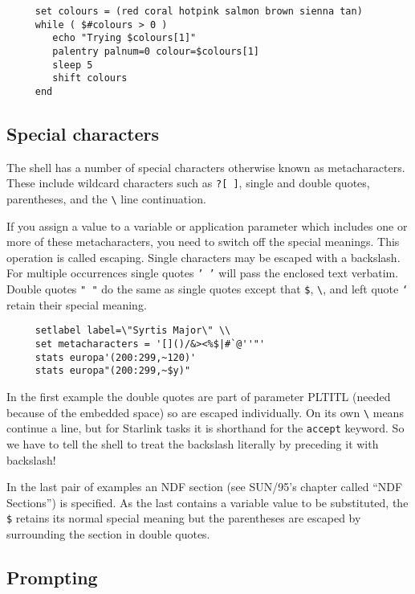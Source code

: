 \documentclass[twoside,11pt]{article}
\newcommand{\htmlref}[2]{#1}
\newcommand{\latex}[1]{#1}
\newcommand{\xref}[3]{#1}
\newcommand{\xlabel}[1]{}
\begin{document}
\small
\begin{verbatim}
     set colours = (red coral hotpink salmon brown sienna tan)
     while ( $#colours > 0 )
        echo "Trying $colours[1]"
        palentry palnum=0 colour=$colours[1]
        sleep 5
        shift colours
     end
\end{verbatim}
\normalsize


\subsection{\xlabel{sc4_se_spec_char}Special characters
\label{sc4_se_spec_char}}

The shell has a number of special characters otherwise known as
\htmlref{{\sf metacharacters}}{sc4_gl_met}.  These include
\htmlref{{\sf wildcard}}{sc4_gl_wild} characters such as {\tt *?[~]},
single and double quotes, parentheses, and the \verb+\+ line
continuation.

If you assign a value to a variable or application parameter which
includes one or more of these metacharacters, you need to switch off
the special meanings.  This operation is called escaping.
Single characters may be escaped with a backslash.  For multiple
occurrences single quotes {\tt '~'} will pass the enclosed text
verbatim.  Double quotes {\tt "~"} do the same as single quotes except
that {\tt \$}, \verb+\+, and left quote {\tt `} retain their special
meaning.  

\small
\begin{verbatim}
     setlabel label=\"Syrtis Major\" \\
     set metacharacters = '[]()/&><%$|#`@''"'
     stats europa'(200:299,~120)'
     stats europa"(200:299,~$y)"
\end{verbatim}
\normalsize
In the first example the double quotes are part of parameter PLTITL
(needed because of the embedded space) so are escaped individually.  On
its own \verb+\+ means continue a line, but for Starlink tasks it is
shorthand for the {\tt accept} keyword.  So we have to tell the shell to
treat the backslash literally by preceding it with backslash!  

In the last pair of examples an \xref{{\sf NDF section}}{sun95}{se_ndfsect}
\latex{(see SUN/95's chapter called ``NDF Sections'')}
is specified.  As the last contains a variable value to be
substituted, the {\tt \$} retains its normal special meaning but the
parentheses are escaped by surrounding the section in double quotes.

\newpage
\subsection{\xlabel{sc4_se_prompting}Prompting\label{sc4_se_prompting}}
\end{document}
